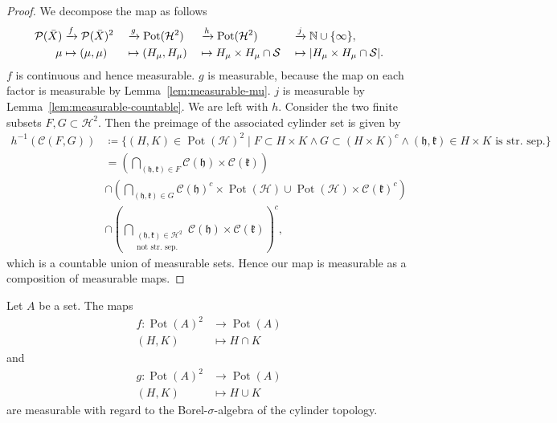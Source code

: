 \begin{proof}
  We decompose the map as follows
  \begin{alignat*}{4}
    \mathcal{P}(\bar X) &\xrightarrow{f} \mathcal{P}(\bar X)^2&&\xrightarrow{g} \operatorname{Pot}(\mathcal{H}^2) &&\xrightarrow{h} \operatorname{Pot}(\mathcal{H}^2) &&\xrightarrow{j} \mathbb{N} \cup \{\infty\},\\
    \mu &\mapsto (\mu, \mu) &&\mapsto (H_\mu, H_\mu)&&\mapsto H_\mu \times H_\mu \cap \mathcal{S} &&\mapsto |H_\mu \times H_\mu \cap \mathcal{S}|.
  \end{alignat*}
  \(f\) is continuous and hence measurable. \(g\) is measurable, because the map on each factor is measurable by Lemma~\ref{lem:measurable-mu}. \(j\) is measurable by Lemma~\ref{lem:measurable-countable}. We are left with \(h\). Consider the two finite subsets \(F, G \subset \mathcal{H}^2\). Then the preimage of the associated cylinder set is given by
  \begin{align*}
    h^{-1}(\mathcal{C}(F,G)) & \coloneqq \{(H, K) \in \operatorname{Pot}(\mathcal{H})^2 \mid F \subset H \times K \wedge G \subset (H \times K)^c \wedge (\mathfrak{h}, \mathfrak{k}) \in H \times K \text{ is str.\ sep.}\}\\
      & = \left (\bigcap_{(\mathfrak{h},\mathfrak{k}) \in F} \mathcal{C}(\mathfrak{h}) \times \mathcal{C}(\mathfrak{k})\right)\\
      & \cap \left (\bigcap_{(\mathfrak{h},\mathfrak{k}) \in G} \mathcal{C}(\mathfrak{h})^c \times \operatorname{Pot}(\mathcal{H}) \cup \operatorname{Pot}(\mathcal{H}) \times \mathcal{C}(\mathfrak{k})^c \right)\\
      & \cap \left( \bigcap_{\substack{(\mathfrak{h}, \mathfrak{k}) \in \mathcal{H}^2\\\text{not str.\ sep.}}} \mathcal{C}(\mathfrak{h}) \times \mathcal{C}(\mathfrak{k})\right)^c,
  \end{align*}
  which is a countable union of measurable sets. Hence our map is measurable as a composition of measurable maps.
\end{proof}

\begin{lemma}
  Let \(A\) be a set. The maps
  \begin{align*}
    f \colon \operatorname{Pot}(A)^2 & \to \operatorname{Pot}(A)\\
    (H, K) & \mapsto H \cap K
  \end{align*}
  and
  \begin{align*}
    g \colon \operatorname{Pot}(A)^2 & \to \operatorname{Pot}(A)\\
    (H, K) & \mapsto H \cup K
  \end{align*}
  are measurable with regard to the Borel-\(\sigma\)-algebra of the cylinder topology.
\end{lemma}

